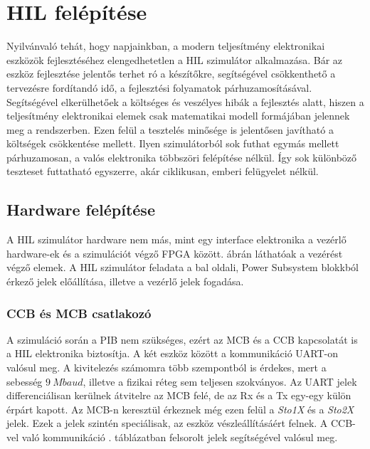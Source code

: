 \chapter{HIL felépítése}

Nyilvánvaló tehát, hogy napjainkban, a modern teljesítmény elektronikai eszközök fejlesztéséhez elengedhetetlen a HIL szimulátor alkalmazása. Bár az eszköz fejlesztése jelentős terhet ró a készítőkre, segítségével csökkenthető a tervezésre fordítandó idő, a fejlesztési folyamatok párhuzamosításával. Segítségével elkerülhetőek a költséges és veszélyes hibák a fejlesztés alatt, hiszen a teljesítmény elektronikai elemek csak matematikai modell formájában jelennek meg a rendszerben. Ezen felül a tesztelés minősége is jelentősen javítható a költségek csökkentése mellett. Ilyen szimulátorból sok futhat egymás mellett párhuzamosan, a valós elektronika többszöri felépítése nélkül. Így sok különböző teszteset futtatható egyszerre, akár ciklikusan, emberi felügyelet nélkül. \cite{sutozoli}\cite{low_cost_rt_hil}\cite{hw_emu}

\section{Hardware felépítése}

A HIL szimulátor hardware nem más, mint egy interface elektronika a vezérlő hardware-ek és a szimulációt végző FPGA között.  ábrán láthatóak a vezérést végző elemek. A HIL szimulátor feladata a bal oldali, Power Subsystem blokkból érkező jelek előállítása, illetve a vezérlő jelek fogadása.

\subsection{CCB és MCB csatlakozó}
A szimuláció során a PIB nem szükséges, ezért az MCB és a CCB kapcsolatát is a HIL elektronika biztosítja. A két eszköz között a kommunikáció UART-on valósul meg. A kivitelezés számomra több szempontból is érdekes, mert a sebesség $9\ Mbaud$, illetve a fizikai réteg sem teljesen szokványos. Az UART jelek differenciálisan kerülnek átvitelre az MCB felé, de az Rx és a Tx egy-egy külön érpárt kapott. Az MCB-n keresztül érkeznek még ezen felül a \emph{Sto1X} és a \emph{Sto2X} jelek. Ezek a jelek szintén speciálisak, az eszköz vészleállításáért felnek. A CCB-vel való kommunikáció . táblázatban felsorolt jelek segítségével valósul meg. 

